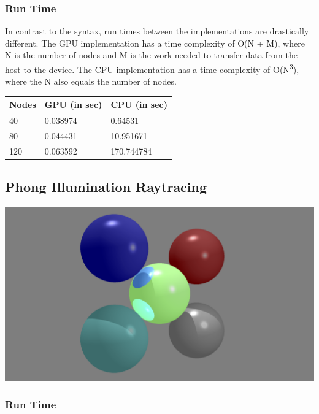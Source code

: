 \documentclass{article}
\begin{document}
{{}

\subsubsection{Run Time}

{\raggedright{}
  In contrast to the syntax, run times between the implementations are drastically
  different. The GPU implementation has a time complexity of O(N + M), where N
  is the number of nodes and M is the work needed to transfer data
  from the host to the device. The CPU implementation has a time complexity of
  O(N\textsuperscript{3}), where the N also equals the number of nodes.
}

\begin{center}
  \begin{tabularx}{\textwidth}{|X|X|X|}
    \hline
    Nodes & GPU (in sec) & CPU (in sec) \\
    \hline
    40 & 0.038974 & 0.64531 \\
    \hline
    80 & 0.044431 & 10.951671 \\
    \hline
    120 & 0.063592 & 170.744784 \\
    \hline
  \end{tabularx}
\end{center}

\subsection{Phong Illumination Raytracing}

\includegraphics[scale=0.6]{raytrace}

\subsubsection{Run Time}

}
\end{document}
